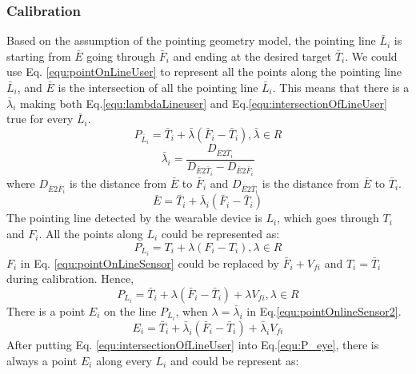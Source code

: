 \subsubsection{Calibration} \label{sec:4-PAST:PASTCalibration}
Based on the assumption of the pointing geometry model, the pointing line $\bar L_i$ is starting from $\bar E$ going through $\bar F_i$ and ending at the desired target $\bar T_i$. We could use Eq. \ref{equ:pointOnLineUser} to  represent all the points along the pointing line $\bar L_i$, and $\bar E$ is the intersection of all the pointing line $\bar L_i$. This means that there is a $\bar \lambda_i$ making both Eq.\ref{equ:lambdaLineuser} and Eq.\ref{equ:intersectionOfLineUser} true for every  $\bar L_i$.
\begin{equation}  \label{equ:pointOnLineUser}
P_{\bar L_i} = {\bar T_i} + \bar\lambda ({\bar F_i} - {\bar T_i}) ,\bar\lambda \in R 
\end{equation}
\begin{equation} \label{equ:lambdaLineuser}
\bar\lambda_i = \frac {D_{\bar E2 \bar T_i}}{D_{\bar E2 \bar T_i} -D_{\bar E2 \bar F_i}} 
\end{equation}
where $D_{\bar E2 \bar F_i}$ is the distance from $\bar E$ to ${{\bar F_i}}$ and $D_{\bar E2 \bar T_i}$ is the distance from ${\bar E}$ to ${\bar T_i}$. 
\begin{equation} \label{equ:intersectionOfLineUser}
{\bar E} = {\bar T_i} + \bar\lambda_i ({\bar F_i} - {\bar T_i}) 
\end{equation}
The pointing line detected by the wearable device is $L_i$, which goes through  ${T_i}$ and $F_i$. All the points along $L_i$ could be represented as:
\begin{equation} \label{equ:pointOnLineSensor}
P_{L_i} = {T_i} + \lambda(F_i - {T_i}) , \lambda \in R 
\end{equation}
$F_i$ in Eq. \ref{equ:pointOnLineSensor} could be replaced by ${\bar F_i} + V_{fi}$ and ${T_i} = {\bar T_i}$ during calibration. Hence,
\begin{equation} \label{equ:pointOnlineSensor2}
P_{L_i} = {\bar T_i} + \lambda({\bar F_i} - {\bar T_i}) + \lambda V_{fi}, \lambda \in R 
\end{equation}
There is a point $E_i$ on the line $P_{L_i}$, when $\lambda = \bar\lambda_i$ in Eq.\ref{equ:pointOnlineSensor2}.
\begin{equation} \label{equ:P_eye}
E_i = {\bar T_i} + \bar\lambda_i({\bar F_i} - {\bar T_i}) + \bar\lambda_i V_{fi}  
\end{equation}
After putting Eq. \ref{equ:intersectionOfLineUser} into Eq.\ref{equ:P_eye}, there is always a point $E_i$ along every $L_i$ and could be represent as:
